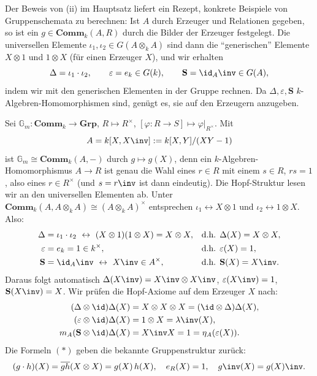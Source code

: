 \documentclass[11pt]{article}
\newcommand{\Comm}{\mathbf{Comm}}
\newcommand{\Grp}{\mathbf{Grp}}
\newcommand{\Sbold}{\mathbf{S}}
\begin{document}
Der Beweis von (ii) im Hauptsatz liefert ein Rezept, konkrete Beispiele von Gruppenschemata zu berechnen: Ist $A$ durch Erzeuger und Relationen gegeben, so ist ein
$g\in\Comm_k(A,R)$ durch die Bilder der Erzeuger festgelegt. Die universellen Elemente $\iota_1,\iota_2\in G(A\otimes_k A)$ sind dann
die "`generischen"' Elemente $X\otimes 1$ und $1\otimes X$ (für einen Erzeuger $X$), und wir erhalten
$$\Delta = \iota_1\cdot\iota_2,\qquad \varepsilon = e_k\in G(k),\qquad \Sbold = \id_A\inv\in G(A),$$
indem wir mit den generischen Elementen in der Gruppe rechnen. Da $\Delta,\varepsilon,\Sbold$ $k$-Algebren-Homomorphismen sind,
genügt es, sie auf den Erzeugern anzugeben.

\begin{example} \Theorem
    Sei $\mathbb{G}_m:\Comm_k\to\Grp$, $R\mapsto R^\times$, $[\varphi: R\to S]\mapsto \varphi|_{R^\times}$. Mit
    $$A = k[X,X\inv] := k[X,Y]/(XY-1)$$
    ist $\mathbb{G}_m\cong\Comm_k(A,-)$ durch $g\mapsto g(X)$, denn ein $k$-Algebren-Homomorphismus $A\to R$ ist genau die Wahl eines
    $r\in R$ mit einem $s\in R$, $rs=1$, also eines $r\in R^\times$ (und $s=r\inv$ ist dann eindeutig).
    Die Hopf-Struktur lesen wir an den universellen Elementen ab. Unter $\Comm_k(A,A\otimes_k A)\cong(A\otimes_k A)^\times$ entsprechen
    $\iota_1\leftrightarrow X\otimes 1$ und $\iota_2\leftrightarrow 1\otimes X$. Also:
    \begin{align*}
        \Delta &= \iota_1\cdot\iota_2 \ \leftrightarrow\ (X\otimes 1)(1\otimes X) = X\otimes X, && \text{d.h. } \Delta(X) = X\otimes X,\\
        \varepsilon &= e_k = 1\in k^\times, && \text{d.h. } \varepsilon(X) = 1,\\
        \Sbold &= \id_A\inv \ \leftrightarrow\ X\inv\in A^\times, && \text{d.h. } \Sbold(X) = X\inv.
    \end{align*}
    Daraus folgt automatisch $\Delta(X\inv) = X\inv\otimes X\inv$, $\varepsilon(X\inv)=1$, $\Sbold(X\inv)=X$.
    Wir prüfen die Hopf-Axiome auf dem Erzeuger $X$ nach:
    \begin{align*}
        (\Delta\otimes\id)\Delta(X) &= X\otimes X\otimes X = (\id\otimes\Delta)\Delta(X),\\
        (\varepsilon\otimes\id)\Delta(X) &= 1\otimes X = \lambda\inv(X),\\
        m_A(\Sbold\otimes\id)\Delta(X) &= X\inv X = 1 = \eta_A(\varepsilon(X)).
    \end{align*}
    Die Formeln $(*)$ geben die bekannte Gruppenstruktur zurück: $$(g\cdot h)(X) = \overline{gh}(X\otimes X) = g(X)\,h(X), \quad e_R(X) = 1, \quad g\inv(X) = g(X)\inv.$$
\end{example}
\end{document}
